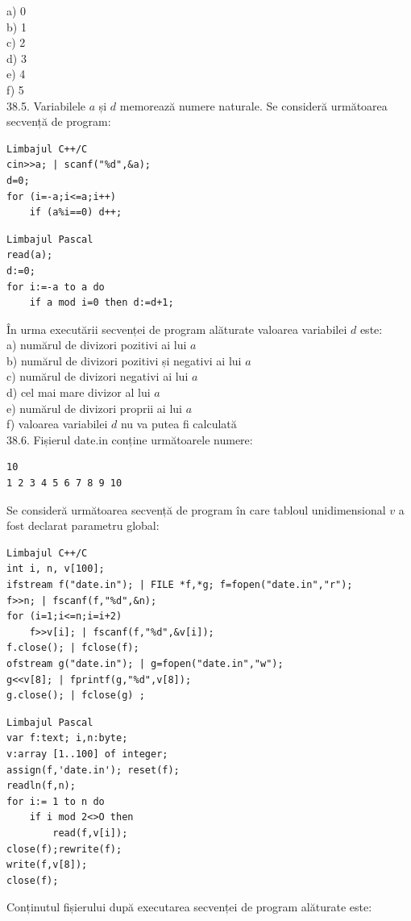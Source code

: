 \begin{itemize}
\begin{enumerate}
a) 0
\\
b) 1
\\
c) 2
\\
d) 3
\\
e) 4
\\
f) 5
\\
38.5. Variabilele $a$ și $d$ memorează numere naturale. Se consideră următoarea secvență de program:
\begin{verbatim}
Limbajul C++/C
cin>>a; | scanf("%d",&a);
d=0;
for (i=-a;i<=a;i++)
    if (a%i==0) d++;
\end{verbatim}
\begin{verbatim}
Limbajul Pascal
read(a);
d:=0;
for i:=-a to a do
    if a mod i=0 then d:=d+1;
\end{verbatim}
În urma executării secvenței de program alăturate valoarea variabilei $d$ este:
\\
a) numărul de divizori pozitivi ai lui $a$
\\
b) numărul de divizori pozitivi și negativi ai lui $a$
\\
c) numărul de divizori negativi ai lui $a$
\\
d) cel mai mare divizor al lui $a$
\\
e) numărul de divizori proprii ai lui $a$
\\
f) valoarea variabilei $d$ nu va putea fi calculată
\\
38.6. Fișierul date.in conține următoarele numere:
\begin{verbatim}
10
1 2 3 4 5 6 7 8 9 10
\end{verbatim}
Se consideră următoarea secvență de program în care tabloul unidimensional $v$ a fost declarat parametru global:
\begin{verbatim}
Limbajul C++/C
int i, n, v[100];
ifstream f("date.in"); | FILE *f,*g; f=fopen("date.in","r");
f>>n; | fscanf(f,"%d",&n);
for (i=1;i<=n;i=i+2)
    f>>v[i]; | fscanf(f,"%d",&v[i]);
f.close(); | fclose(f);
ofstream g("date.in"); | g=fopen("date.in","w");
g<<v[8]; | fprintf(g,"%d",v[8]);
g.close(); | fclose(g) ;
\end{verbatim}
\begin{verbatim}
Limbajul Pascal
var f:text; i,n:byte;
v:array [1..100] of integer;
assign(f,'date.in'); reset(f);
readln(f,n);
for i:= 1 to n do
    if i mod 2<>O then
        read(f,v[i]);
close(f);rewrite(f);
write(f,v[8]);
close(f);
\end{verbatim}
Conținutul fișierului după executarea secvenței de program alăturate este:
\\

\end{enumerate}
\end{itemize}
